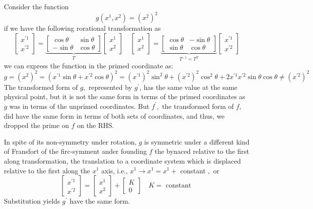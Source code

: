 \begin{example}
Consider the function 
\begin{equation}
g\left(x^{1}, x^{2}\right)=\left(x^{2}\right)^{2}
\end{equation}
if we have the following rorational transformation as
$$
\left[\begin{array}{l}
{x^{\prime 1}} \\
{x^{\prime 2}}
\end{array}\right]=\underbrace{\left[\begin{array}{cc}
{\cos \theta} & {\sin \theta} \\
{-\sin \theta} & {\cos \theta}
\end{array}\right]}_T\left[\begin{array}{l}
{x^{1}} \\
{x^{2}}
\end{array}\right]
\quad
\left[\begin{array}{l}
{x^{1}} \\
{x^{2}}
\end{array}\right]=\underbrace{\left[\begin{array}{ll}
{\cos \theta} & {-\sin \theta} \\
{\sin \theta} & {\cos \theta}
\end{array}\right]}_{T^{-1}=T^T}\left[\begin{array}{l}
{x^{\prime1}} \\
{x^{\prime2}}
\end{array}\right]
$$
we can express the function in the primed coordinate as:
$$
g=\left(x^{2}\right)^{2}=\left(x^{\prime 1} \sin \theta+x^{\prime 2} \cos \theta\right)^{2}=\left(x^{\prime 1}\right)^{2} \sin ^{2} \theta+\left(x^{\prime 2}\right)^{2} \cos ^{2} \theta+2 x^{\prime 1} x^{\prime 2} \sin \theta \cos \theta \neq\left(x^{\prime 2}\right)^{2}
$$
The transformed form of $g,$ represented by $g^{\prime}$, has the same value at the same physical point, but it is not the same form in terms of the primed coordinates as $g$ was in terms of the unprimed coordinates. But $f^{\prime},$ the transformed form of $f,$ did have the same form in terms of both sets of coordinates, and thus, we dropped the prime on $f$ on the RHS.

In spite of its non-symmetry under rotation, $g$ is symmetric under a different kind of Fransfort of the firc-symment ander founding $f$ the bynaced relative to the first along transformation, the translation to a coordinate system which is displaced relative to the first along the $x^{1}$ axis, i.e., $x^{1} \rightarrow x^{1}=x^{1}+$ constant $,$ or
$$
\left[\begin{array}{l}
{x^{\prime 1}} \\
{x^{\prime 2}}
\end{array}\right]=\left[\begin{array}{l}
{x^{1}} \\
{x^{2}}
\end{array}\right]+\left[\begin{array}{l}
{K} \\
{0}
\end{array}\right] \quad K=\text { constant }
$$
Substitution yields $g^{\prime}$ have the same form.
\end{example}
